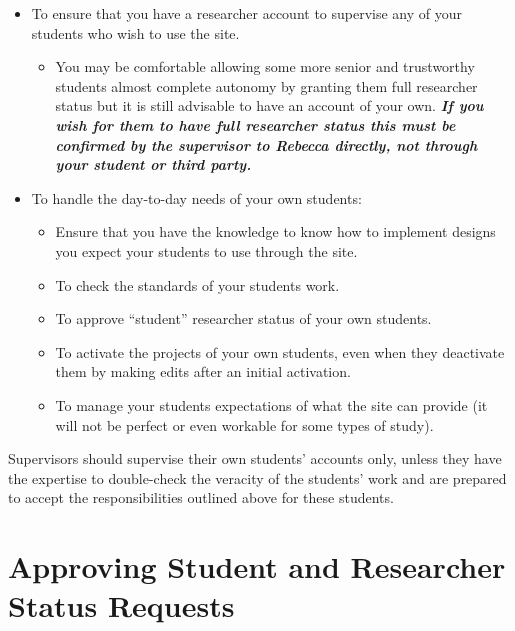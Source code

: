 \documentclass[]{book}
\providecommand{\tightlist}{%
  \setlength{\itemsep}{0pt}\setlength{\parskip}{0pt}}
\begin{document}
\begin{itemize}
\tightlist
\item
  To ensure that you have a researcher account to supervise any of your students who wish to use the site.

  \begin{itemize}
  \tightlist
  \item
    You may be comfortable allowing some more senior and trustworthy students almost complete autonomy by granting them full researcher status but it is still advisable to have an account of your own.
    \textbf{\emph{If you wish for them to have full researcher status this must be confirmed by the supervisor to Rebecca directly, not through your student or third party.}}
  \end{itemize}
\item
  To handle the day-to-day needs of your own students:

  \begin{itemize}
  \tightlist
  \item
    Ensure that you have the knowledge to know how to implement designs you expect your students to use through the site.
  \item
    To check the standards of your students work.
  \item
    To approve ``student'' researcher status of your own students.
  \item
    To activate the projects of your own students, even when they deactivate them by making edits after an initial activation.
  \item
    To manage your students expectations of what the site can provide (it will not be perfect or even workable for some types of study).
  \end{itemize}
\end{itemize}

\begin{warning}
Supervisors should supervise their own students' accounts only, unless
they have the expertise to double-check the veracity of the students'
work and are prepared to accept the responsibilities outlined above for
these students.
\end{warning}

\hypertarget{approving-student-and-researcher-status-requests-1}{%
\section*{Approving Student and Researcher Status Requests}\label{approving-student-and-researcher-status-requests-1}}
\end{document}
